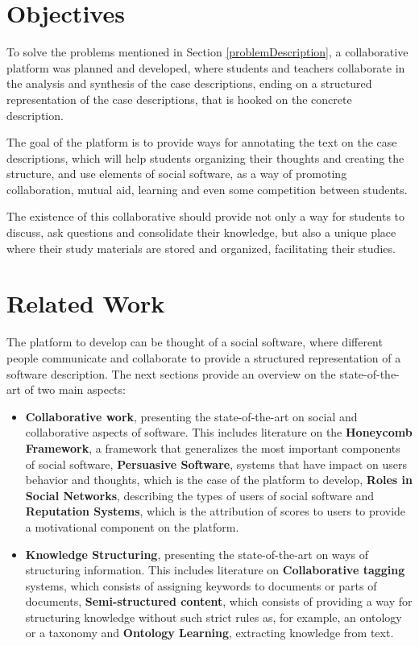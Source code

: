 \documentclass[conference]{IEEEtran}
\begin{document}
\section{Objectives}
\label{objectives}
To solve the problems mentioned in Section \ref{problemDescription}, a collaborative platform was planned and developed, where students and teachers collaborate in the analysis and synthesis of the case descriptions, ending on a structured representation of the case descriptions, that is hooked on the concrete description. 

The goal of the platform is to provide ways for annotating the text on the case descriptions, which will help students organizing their thoughts and creating the structure, and use elements of social software, as a way of promoting collaboration, mutual aid, learning and even some competition between students.
 
The existence of this collaborative should provide not only a way for students to discuss, ask questions and consolidate their knowledge, but also a unique place where their study materials are stored and organized, facilitating their studies.

\section{Related Work}
\label{relatedWork}
The platform to develop can be thought of a social software, where different people communicate and collaborate to provide a structured representation of a software description.
The next sections provide an overview on the state-of-the-art of two main aspects:
\begin{itemize}
\item \textbf{Collaborative work}, presenting the state-of-the-art on social and collaborative aspects of software. This includes literature on the \textbf{Honeycomb Framework}, a framework that generalizes the most important components of social software, \textbf{Persuasive Software}, systems that have impact on users behavior and thoughts, which is the case of the platform to develop, \textbf{Roles in Social Networks}, describing the types of users of social software and \textbf{Reputation Systems}, which is the attribution of scores to users to provide a motivational component on the platform.
	
\item \textbf{Knowledge Structuring}, presenting the state-of-the-art on ways of structuring information. This includes literature on \textbf{Collaborative tagging }systems, which consists of assigning keywords to documents or parts of documents, \textbf{Semi-structured content}, which consists of providing a way for structuring knowledge without such strict rules as, for example, an ontology or a taxonomy and \textbf{Ontology Learning}, extracting knowledge from text.
\end{itemize}
\end{document}
